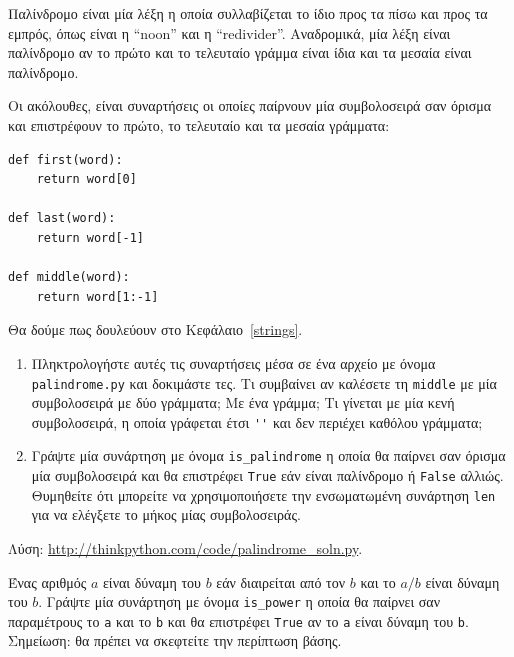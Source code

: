 \documentclass[10pt]{book}
\begin{document}
\begin{exercise}
\label{palindrome}

Παλίνδρομο είναι μία λέξη η οποία συλλαβίζεται το ίδιο προς τα πίσω
και προς τα εμπρός, όπως είναι η  ``noon''  και η  ``redivider''. 
Αναδρομικά, μία λέξη είναι παλίνδρομο αν το πρώτο και το τελευταίο γράμμα είναι
ίδια και τα μεσαία είναι παλίνδρομο.

Οι ακόλουθες, είναι συναρτήσεις οι οποίες παίρνουν μία συμβολοσειρά
σαν όρισμα και επιστρέφουν το πρώτο, το τελευταίο και τα μεσαία γράμματα:

\begin{verbatim}
def first(word):
    return word[0]

def last(word):
    return word[-1]

def middle(word):
    return word[1:-1]
\end{verbatim}
%

Θα δούμε πως δουλεύουν στο Κεφάλαιο~\ref{strings}.

\begin{enumerate}

\item Πληκτρολογήστε αυτές τις συναρτήσεις μέσα σε ένα αρχείο
με όνομα {\tt palindrome.py} και δοκιμάστε τες. Τι συμβαίνει
αν καλέσετε τη {\tt middle} με μία συμβολοσειρά με δύο γράμματα; 
Με ένα γράμμα; Τι γίνεται με μία κενή συμβολοσειρά, η οποία
γράφεται έτσι \verb"''" και δεν περιέχει καθόλου γράμματα;

\item Γράψτε μία συνάρτηση με όνομα \verb"is_palindrome"
η οποία θα παίρνει σαν όρισμα μία συμβολοσειρά και θα επιστρέφει 
{\tt True} εάν είναι παλίνδρομο ή {\tt False} αλλιώς.
Θυμηθείτε ότι μπορείτε να χρησιμοποιήσετε την ενσωματωμένη συνάρτηση
{\tt len} για να ελέγξετε το μήκος μίας συμβολοσειράς.

\end{enumerate}

Λύση: \url{http://thinkpython.com/code/palindrome_soln.py}.
\\
\end{exercise}


\begin{exercise}

Ένας αριθμός $a$ είναι δύναμη του $b$ εάν
διαιρείται από τον $b$ και το $a/b$ είναι δύναμη
του $b$. Γράψτε μία συνάρτηση με όνομα \verb"is_power"
η οποία θα παίρνει σαν παραμέτρους το {\tt a} και το {\tt b} 
και θα επιστρέφει {\tt True} αν το {\tt a} είναι
δύναμη του {\tt b}. 
Σημείωση: θα πρέπει να σκεφτείτε την περίπτωση βάσης.
\\
\end{exercise}
\end{document}

